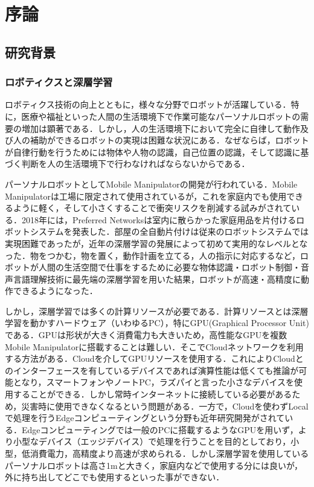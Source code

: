 \chapter{序論}
\label{chap_intro}

\section{研究背景}
\subsection{ロボティクスと深層学習}
ロボティクス技術の向上とともに，様々な分野でロボットが活躍している．特に，医療や福祉といった人間の生活環境下で作業可能なパーソナルロボットの需要の増加は顕著である．しかし，人の生活環境下において完全に自律して動作及び人の補助ができるロボットの実現は困難な状況にある．なぜならば，ロボットが自律行動を行うためには物体や人物の認識，自己位置の認識，そして認識に基づく判断を人の生活環境下で行わなければならないからである．

パーソナルロボットとしてMobile Manipulatorの開発が行われている．Mobile Manipulatorは工場に限定されて使用されているが，これを家庭内でも使用できるように軽く，そして小さくすることで衝突リスクを削減する試みがされている．2018年には，Preferred Networksは室内に散らかった家庭用品を片付けるロボットシステムを発表した\cite{お片づけロボット}．部屋の全自動片付けは従来のロボットシステムでは実現困難であったが，近年の深層学習の発展によって初めて実用的なレベルとなった．物をつかむ，物を置く，動作計画を立てる，人の指示に対応するなど，ロボットが人間の生活空間で仕事をするために必要な物体認識・ロボット制御・音声言語理解技術に最先端の深層学習を用いた結果，ロボットが高速・高精度に動作できるようになった．

しかし，深層学習では多くの計算リソースが必要である．計算リソースとは深層学習を動かすハードウェア（いわゆるPC），特にGPU(Graphical Processor Unit)である．GPUは形状が大きく消費電力も大きいため，高性能なGPUを複数Mobile Manipulatorに搭載することは難しい．そこでCloudネットワークを利用する方法がある．Cloudを介してGPUリソースを使用する．これによりCloudとのインターフェースを有しているデバイスであれば演算性能は低くても推論が可能となり，スマートフォンやノートPC，ラズパイと言った小さなデバイスを使用することができる．しかし常時インターネットに接続している必要があるため，災害時に使用できなくなるという問題がある．一方で，Cloudを使わずLocalで処理を行うEdgeコンピューティングという分野も近年研究開発がされている．Edgeコンピューティングでは一般のPCに搭載するようなGPUを用いず，より小型なデバイス（エッジデバイス）で処理を行うことを目的としており，小型，低消費電力，高精度より高速が求められる．しかし深層学習を使用しているパーソナルロボットは高さ1mと大きく，家庭内などで使用する分には良いが，外に持ち出してどこでも使用するといった事ができない．



